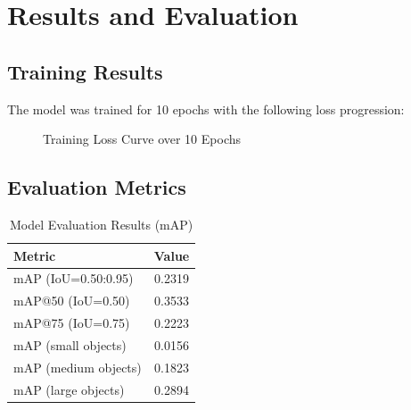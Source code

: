\documentclass[12pt,a4paper]{article}
\begin{document}
\section{Results and Evaluation}

\subsection{Training Results}

The model was trained for 10 epochs with the following loss progression:

\begin{figure}[H]
    \centering
    \caption{Training Loss Curve over 10 Epochs}
    \label{fig:loss_curve}
\end{figure}

\subsection{Evaluation Metrics}

\begin{table}[H]
    \centering
    \caption{Model Evaluation Results (mAP)}
    \label{tab:map_results}
    \begin{tabular}{|l|c|}
        \hline
        \textbf{Metric} & \textbf{Value} \\
        \hline
        mAP (IoU=0.50:0.95) & 0.2319 \\
        mAP@50 (IoU=0.50) & 0.3533 \\
        mAP@75 (IoU=0.75) & 0.2223 \\
        mAP (small objects) & 0.0156 \\
        mAP (medium objects) & 0.1823 \\
        mAP (large objects) & 0.2894 \\
        \hline
    \end{tabular}
\end{table}
\end{document}
